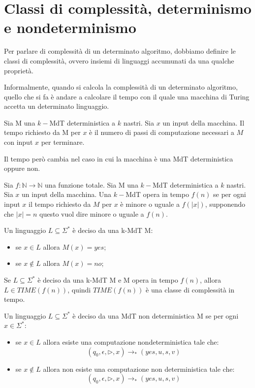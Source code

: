 \section{Classi di complessità, determinismo e nondeterminismo ~\cite{4}}
Per parlare di complessità di un determinato algoritmo, dobbiamo definire le classi di complessità, ovvero insiemi di linguaggi accumunati da una qualche proprietà.

Informalmente, quando si calcola la complessità di un determinato algoritmo, quello che si fa è andare a calcolare il tempo con il quale una macchina di Turing accetta un determinato linguaggio.

\begin{definition}
    Sia M una $k-$MdT deterministica a $k$ nastri. \hfill \break
    Sia $x$ un input della macchina. \hfill \break
    Il tempo richiesto da M per $x$ è il numero di passi di computazione necessari a $M$ con input $x$ per terminare.
\end{definition}

Il tempo però cambia nel caso in cui la macchina è una MdT deterministica oppure non. 

\begin{definition}
    Sia $f: \mathbb{N} \rightarrow \mathbb{N}$ una funzione totale. \hfill \break
    Sia M una $k-$MdT deterministica a $k$ nastri. \hfill \break
    Sia $x$ un input della macchina. \hfill \break
    Una $k-$MdT opera in tempo $f(n)$ se per ogni input $x$ il tempo richiesto da $M$ per $x$ è minore o uguale a $f(|x|)$, supponendo che $|x|=n$ questo vuol dire minore o uguale a $f(n)$. 
\end{definition}

Un linguaggio $L\subseteq\Sigma^*$ è deciso da una k-MdT M:
\begin{itemize}
    \item se $x\in L$ allora $M(x)=yes$;
    \item se $x\not\in L$ allora $M(x)=no$;
\end{itemize}

\begin{definition}
    Se $L \subseteq \Sigma^*$ è deciso da una k-MdT M e M opera in tempo $f(n)$, allora $L\in TIME(f(n))$, quindi $TIME(f(n))$ è una classe di complessità in tempo. 
\end{definition}

\begin{definition}
    Un linguaggio $L \subseteq \Sigma^*$ è deciso da una MdT non deterministica M se per ogni $x \in \Sigma^*$: 
    \begin{itemize}
        \item se $x \in L$ allora esiste una computazione nondeterministica tale che: 
        $$
        (q_0, \epsilon, \triangleright, x) \rightarrow_* (yes, u,s,v)
        $$
        \item se $x \not\in L$ allora non esiste una computazione non deterministica tale che: 
        $$
        (q_0, \epsilon, \triangleright, x) \rightarrow_* (yes, u,s,v)
        $$
    \end{itemize}
\end{definition}


